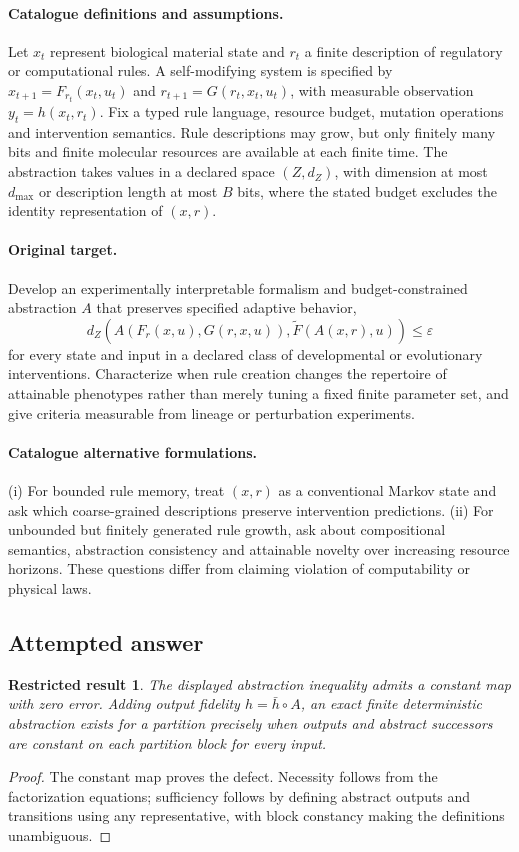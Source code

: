 \documentclass[11pt]{article}
\newtheorem{attemptresult}{Restricted result}[section]
\begin{document}
\paragraph{Catalogue definitions and assumptions.}
Let $x_t$ represent biological material state and $r_t$ a finite description of regulatory or computational rules. A self-modifying system is specified by $x_{t+1}=F_{r_t}(x_t,u_t)$ and $r_{t+1}=G(r_t,x_t,u_t)$, with measurable observation $y_t=h(x_t,r_t)$. Fix a typed rule language, resource budget, mutation operations and intervention semantics. Rule descriptions may grow, but only finitely many bits and finite molecular resources are available at each finite time. The abstraction takes values in a declared space $(Z,d_Z)$, with dimension at most $d_{\max}$ or description length at most $B$ bits, where the stated budget excludes the identity representation of $(x,r)$.
\paragraph{Original target.}
Develop an experimentally interpretable formalism and budget-constrained abstraction $A$ that preserves specified adaptive behavior,
\[d_Z\!\left(A(F_r(x,u),G(r,x,u)),\widetilde F(A(x,r),u)\right)\le\varepsilon\]
for every state and input in a declared class of developmental or evolutionary interventions. Characterize when rule creation changes the repertoire of attainable phenotypes rather than merely tuning a fixed finite parameter set, and give criteria measurable from lineage or perturbation experiments.
\paragraph{Catalogue alternative formulations.}
(i) For bounded rule memory, treat $(x,r)$ as a conventional Markov state and ask which coarse-grained descriptions preserve intervention predictions. (ii) For unbounded but finitely generated rule growth, ask about compositional semantics, abstraction consistency and attainable novelty over increasing resource horizons. These questions differ from claiming violation of computability or physical laws.
\subsection{Attempted answer}
\begin{attemptresult}
The displayed abstraction inequality admits a constant map with zero error. Adding output fidelity $h=\bar h\circ A$, an exact finite deterministic abstraction exists for a partition precisely when outputs and abstract successors are constant on each partition block for every input.
\end{attemptresult}
\begin{proof}
The constant map proves the defect. Necessity follows from the factorization equations; sufficiency follows by defining abstract outputs and transitions using any representative, with block constancy making the definitions unambiguous.
\end{proof}
\end{document}
